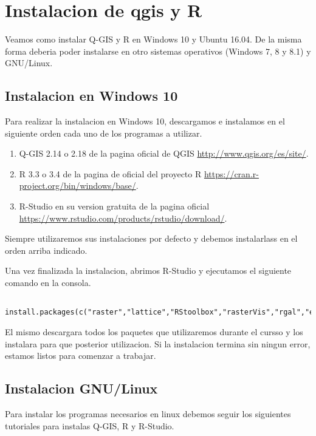 \chapter{Instalacion de qgis y R}

Veamos como instalar Q-GIS y R en Windows 10 y Ubuntu 16.04. De la misma forma deberia poder instalarse en otro sistemas operativos (Windows 7, 8 y 8.1) y GNU/Linux.

\section{Instalacion en Windows 10}

Para realizar la instalacion en Windows 10, descargamos e instalamos en el siguiente orden cada uno de los programas a utilizar.

\begin{enumerate}
  \item Q-GIS 2.14 o 2.18 de la pagina oficial de QGIS \url{http://www.qgis.org/es/site/}.
  \item R 3.3 o 3.4 de la pagina de oficial del proyecto R \url{https://cran.r-project.org/bin/windows/base/}.
  \item R-Studio en su version gratuita de la pagina oficial \url{https://www.rstudio.com/products/rstudio/download/}.
\end{enumerate}

Siempre utilizaremos sus instalaciones por defecto y debemos instalarlass en el orden arriba indicado.

Una vez finalizada la instalacion, abrimos R-Studio y ejecutamos el siguiente comando en la consola.

\begin{lstlisting}
  install.packages(c("raster","lattice","RStoolbox","rasterVis","rgal","e1071","randomForest","kernlab"))
\end{lstlisting}

El mismo descargara todos los paquetes que utilizaremos durante el cursso y los instalara para que posterior utilizacion. Si la instalacion termina sin ningun error, estamos listos para comenzar a trabajar.

\section{Instalacion GNU/Linux}

Para instalar los programas necesarios en linux debemos seguir los siguientes tutoriales para instalas Q-GIS, R y R-Studio.

